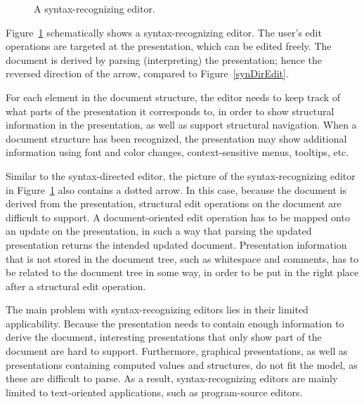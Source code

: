 \documentclass{speauth}
\begin{document}
\begin{figure}

\begin{small}

\begin{center}

\begin{center}


\end{center}\caption{A syntax-recognizing editor.}\label{synRecEdit} 

\end{center}

\end{small}

\end{figure}

Figure~\ref{synRecEdit} schematically shows a syntax-recognizing editor. The user's edit operations are targeted at the presentation, which can be edited freely. The document is derived by parsing (interpreting) the presentation; hence the reversed direction of the arrow, compared to Figure~\ref{synDirEdit}.

For each element in the document structure, the editor needs to keep track of what parts of the presentation it corresponds to, in order to show structural information in the presentation, as well as support structural navigation. When a document structure has been recognized, the presentation may show additional information using font and color changes, context-sensitive menus, tooltips, etc.

Similar to the syntax-directed editor, the picture of the syntax-recognizing editor in Figure~\ref{synRecEdit} also contains a dotted arrow. In this case, because the document is derived from the presentation, structural edit operations on the document are difficult to support. A document-oriented edit operation has to be mapped onto an update on the presentation, in such a way that parsing the updated presentation returns the intended updated document. Presentation information that is not stored in the document tree, such as whitespace and comments, has to be related to the document tree in some way, in order to be put in the right place after a structural edit operation.

The main problem with syntax-recognizing editors lies in their limited applicability. Because the presentation needs to contain enough information to derive the document, interesting presentations that only show part of the document are hard to support. Furthermore, graphical presentations, as well as presentations containing computed values and structures, do not fit the model, as these are difficult to parse. As a result, syntax-recognizing editors are mainly limited to text-oriented applications, such as program-source editors.
\end{document}
